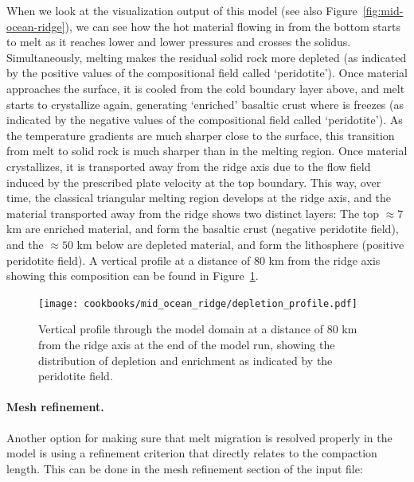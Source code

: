 \documentclass{article}
\begin{document}
When we look at the visualization output of this model (see also Figure~\ref{fig:mid-ocean-ridge}), 
we can see how the hot material flowing in 
from the bottom starts to melt as it reaches lower and lower pressures and crosses the solidus.  Simultaneously, melting makes the residual solid rock more depleted (as indicated by the positive 
values of the compositional field called `peridotite'). Once material approaches the surface, 
it is cooled from the cold boundary layer above, and melt starts to crystallize again, generating 
`enriched' basaltic crust where is freezes (as indicated by the negative values of the compositional 
field called `peridotite'). As the temperature gradients are much sharper close to the surface, this 
transition from melt to solid rock is much sharper than in the melting region. Once material 
crystallizes, it is transported away from the ridge axis due to the flow field induced by the prescribed 
plate velocity at the top boundary. This way, over time, the classical triangular melting region develops 
at the ridge axis, and the material transported away from the ridge shows two distinct layers:
The top $\approx 7$ km are enriched material, and form the basaltic crust (negative peridotite field), 
and the $\approx 50$ km below are depleted material, and form the lithosphere (positive peridotite field). 
A vertical profile at a distance of 80 km from the ridge axis showing this composition can be found in Figure~\ref{fig:mid-ocean-ridge-profile}.

\begin{figure}
    \centering
    \texttt{[image: cookbooks/mid\_ocean\_ridge/depletion\_profile.pdf]}
    \caption{Vertical profile through the model domain at a distance of 80 km from the ridge axis
             at the end of the model run, showing the distribution of depletion and enrichment as
             indicated by the peridotite field.}
    \label{fig:mid-ocean-ridge-profile}
\end{figure}

\paragraph{Mesh refinement.}
Another option for making sure that melt migration is resolved properly in the model is using a 
refinement criterion that directly relates to the compaction length. This can be done in the mesh 
refinement section of the input file:


\end{document}
